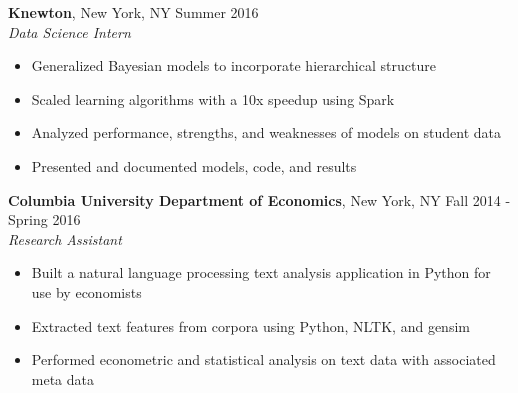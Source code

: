 \documentclass{res}
\begin{document}
\begin{resume}
\textbf{Knewton}, New York, NY \hfill{Summer 2016}\\
\textit{Data Science Intern}
\begin{itemize}
\item Generalized Bayesian models to incorporate hierarchical structure 
\item Scaled learning algorithms with a 10x speedup  using Spark
\item Analyzed performance, strengths, and weaknesses of models on student data
\item Presented and documented models, code, and results
\end{itemize}

\begin{comment}
\textbf{Big Data Summer Institute}, University of Michigan, Ann Arbor, MI \hfill Summer 2015
\\ \textit{Intern}
\begin{itemize}
\item Implemented a search and counting algorithm for sub-sequences of the human genome
\item Attended lectures on machine learning, algorithms, data science, and statistics 
\item Presented work to faculty and undergraduates to promote the program to other institutions
\end{itemize}
\end{comment}

\textbf{Columbia University Department of Economics}, New York, NY \hfill Fall 2014 - Spring 2016\\
\textit{Research Assistant}
\begin{itemize}
\item Built a natural language processing text analysis application in Python for use by economists 
\item Extracted text features from corpora using Python, NLTK, and gensim
\item Performed econometric and statistical analysis on text data with associated meta data
\end{itemize}


\begin{comment}
	\textbf{Center for Discrete Mathematics and Theoretical Computer Science}, Piscataway, NJ\\
\textit{Research Intern} \hfill Summer 2014 
\begin{itemize}
\item Implemented a spectral machine learning algorithm in Python to learn a Hidden Markov Model
\item Improved algorithm runtime 100x through utilization of Python's NumPy and SciPy libraries
\item Presented results to colleagues and faculty to gain feedback
\end{itemize}


\end{comment}
\end{resume}
\end{document}
